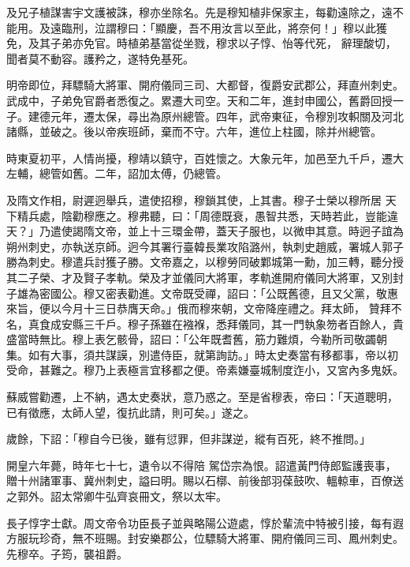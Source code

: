 \begin{pinyinscope}
 及兄子植謀害宇文護被誅，穆亦坐除名。先是穆知植非保家主，每勸遠除之，遠不能用。及遠臨刑，泣謂穆曰：「顯慶，吾不用汝言以至此，將奈何！」穆以此獲免，及其子弟亦免官。時植弟基當從坐戮，穆求以子惇、怡等代死，
 辭理酸切，聞者莫不動容。護矜之，遂特免基死。



 明帝即位，拜驃騎大將軍、開府儀同三司、大都督，復爵安武郡公，拜直州刺史。武成中，子弟免官爵者悉復之。累遷大司空。天和二年，進封申國公，舊爵回授一子。建德元年，遷太保，尋出為原州總管。四年，武帝東征，令穆別攻軹關及河北諸縣，並破之。後以帝疾班師，棄而不守。六年，進位上柱國，除并州總管。



 時東夏初平，人情尚擾，穆靖以鎮守，百姓懷之。大象元年，加邑至九千戶，遷大左輔，總管如舊。二年，詔加太傅，仍總管。



 及隋文作相，尉遲迥舉兵，遣使招穆，穆鎖其使，上其書。穆子士榮以穆所居
 天下精兵處，陰勸穆應之。穆弗聽，曰：「周德既衰，愚智共悉，天時若此，豈能違天？」乃遣使謁隋文帝，並上十三環金帶，蓋天子服也，以微申其意。時迥子誼為朔州刺史，亦執送京師。迥今其署行臺韓長業攻陷潞州，執刺史趙威，署城人郭子勝為刺史。穆遣兵討獲子勝。文帝嘉之，以穆勞同破鄴城第一勳，加三轉，聽分授其二子榮、才及賢子孝軌。榮及才並儀同大將軍，孝軌進開府儀同大將軍，又別封子雄為密國公。穆又密表勸進。文帝既受禪，詔曰：「公既舊德，且又父黨，敬惠來旨，便以今月十三日恭膺天命。」俄而穆來朝，文帝降座禮之。拜太師，
 贊拜不名，真食成安縣三千戶。穆子孫雖在襁褓，悉拜儀同，其一門執象笏者百餘人，貴盛當時無比。穆上表乞骸骨，詔曰：「公年既耆舊，筋力難煩，今勒所司敬蠲朝集。如有大事，須共謀謨，別遣侍臣，就第詢訪。」時太史奏當有移都事，帝以初受命，甚難之。穆乃上表極言宜移都之便。帝素嫌臺城制度迮小，又宮內多鬼妖。



 蘇威嘗勸遷，上不納，遇太史奏狀，意乃惑之。至是省穆表，帝曰：「天道聰明，已有徵應，太師人望，復抗此請，則可矣。」遂之。



 歲餘，下詔：「穆自今已後，雖有愆罪，但非謀逆，縱有百死，終不推問。」



 開皇六年薨，時年七十七，遺令以不得陪
 駕岱宗為恨。詔遣黃門侍郎監護喪事，贈十州諸軍事、冀州刺史，謚曰明。賜以石槨、前後部羽葆鼓吹、轀輬車，百僚送之郭外。詔太常卿牛弘齊哀冊文，祭以太牢。



 長子惇字士獻。周文帝令功臣長子並與略陽公遊處，惇於輩流中特被引接，每有遐方服玩珍奇，無不班賜。封安樂郡公，位驃騎大將軍、開府儀同三司、鳳州刺史。先穆卒。子筠，襲祖爵。




\end{pinyinscope}
